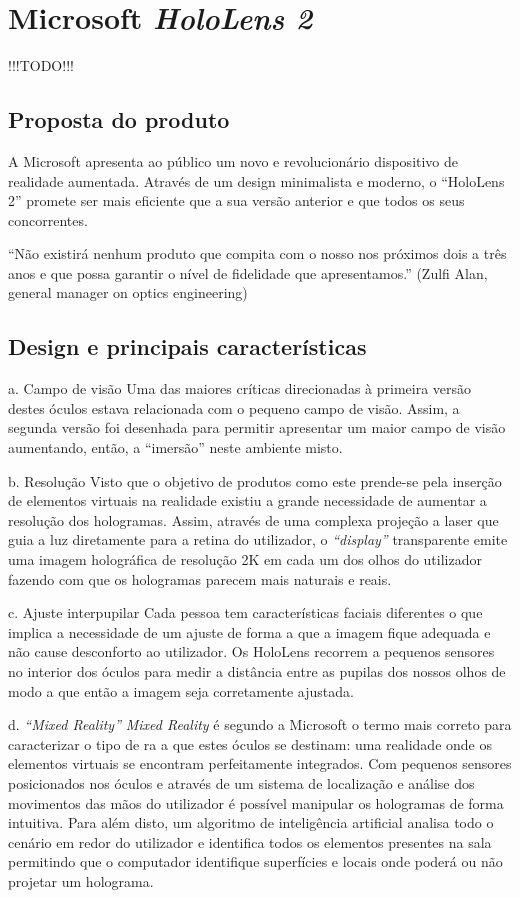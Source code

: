 \documentclass{report}
\begin{document}
\chapter{Microsoft \textit{HoloLens 2}}
\label{chap.microsoft-hololens-2}
!!!TODO!!!

\section{Proposta do produto}
A Microsoft apresenta ao público um novo e revolucionário dispositivo de realidade aumentada. Através de um design minimalista e moderno, o “HoloLens 2” promete ser mais eficiente que a sua versão anterior e que todos os seus concorrentes.

“Não existirá nenhum produto que compita com o nosso nos próximos dois a três anos e que possa garantir o nível de fidelidade que apresentamos.” (Zulfi Alan, general manager on optics engineering)

\section{Design e principais características}
a. Campo de visão
Uma das maiores críticas direcionadas à primeira versão destes óculos estava relacionada com o pequeno campo de visão. Assim, a segunda versão foi desenhada para permitir apresentar um maior campo de visão aumentando, então, a “imersão” neste ambiente misto.

b. Resolução
Visto que o objetivo de produtos como este prende-se pela inserção de elementos virtuais na realidade existiu a grande necessidade de aumentar a resolução dos hologramas. Assim, através de uma complexa projeção a laser que guia a luz diretamente para a retina do utilizador, o \textit{“display”} transparente emite uma imagem holográfica de resolução 2K em cada um dos olhos do utilizador fazendo com que os hologramas parecem mais naturais e reais.

c. Ajuste interpupilar
Cada pessoa tem características faciais diferentes o que implica a necessidade de um ajuste de forma a que a imagem fique adequada e não cause desconforto ao utilizador. Os HoloLens recorrem a pequenos sensores no interior dos óculos para medir a distância entre as pupilas dos nossos olhos de modo a que então a imagem seja corretamente ajustada.

d. \textit{“Mixed Reality”}
\textit{Mixed Reality} é segundo a Microsoft o termo mais correto para caracterizar o tipo de \ac{ra} a que estes óculos se destinam: uma realidade onde os elementos virtuais se encontram perfeitamente integrados. Com pequenos sensores posicionados nos óculos e através de um sistema de localização e análise dos movimentos das mãos do utilizador é possível manipular os hologramas de forma intuitiva. Para além disto, um algoritmo de inteligência artificial analisa todo o cenário em redor do utilizador e identifica todos os elementos presentes na sala permitindo que o computador identifique superfícies e locais onde poderá ou não projetar um holograma.
\end{document}

